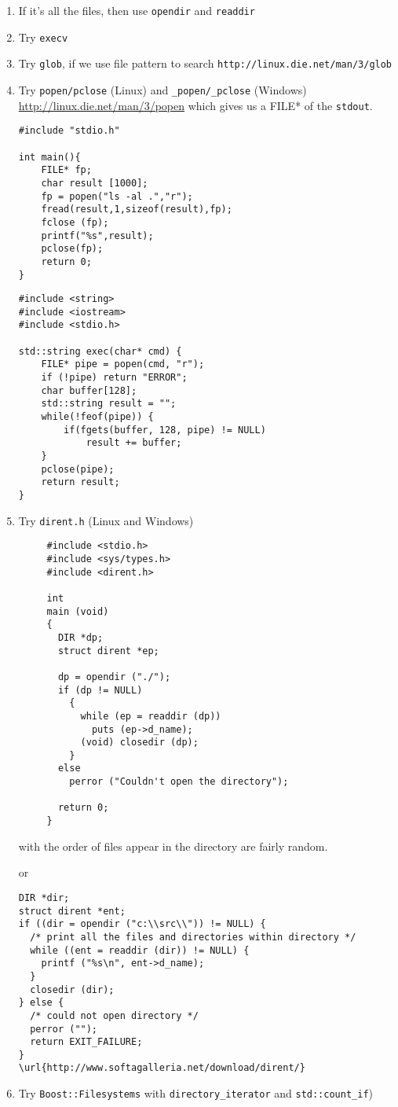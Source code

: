 \begin{enumerate}
  \item If it's all the files, then use \verb!opendir! and \verb!readdir!
  \item Try \verb!execv!
  \item Try \verb!glob!, if we use file pattern to search
  \verb!http://linux.die.net/man/3/glob!
  \item Try \verb!popen/pclose! (Linux) and
  \verb!_popen/_pclose! (Windows) \url{http://linux.die.net/man/3/popen} which
  gives us a FILE* of the \verb!stdout!. 
  \begin{verbatim}
#include "stdio.h"

int main(){
    FILE* fp;
    char result [1000];
    fp = popen("ls -al .","r");
    fread(result,1,sizeof(result),fp);
    fclose (fp);
    printf("%s",result);
    pclose(fp);
    return 0;
}    
  \end{verbatim}
  
  \begin{verbatim}
#include <string>
#include <iostream>
#include <stdio.h>

std::string exec(char* cmd) {
    FILE* pipe = popen(cmd, "r");
    if (!pipe) return "ERROR";
    char buffer[128];
    std::string result = "";
    while(!feof(pipe)) {
    	if(fgets(buffer, 128, pipe) != NULL)
    		result += buffer;
    }
    pclose(pipe);
    return result;
}
  \end{verbatim}
  
  \item Try \verb!dirent.h! (Linux and Windows)
\begin{verbatim}
     #include <stdio.h>
     #include <sys/types.h>
     #include <dirent.h>
     
     int
     main (void)
     {
       DIR *dp;
       struct dirent *ep;
     
       dp = opendir ("./");
       if (dp != NULL)
         {
           while (ep = readdir (dp))
             puts (ep->d_name);
           (void) closedir (dp);
         }
       else
         perror ("Couldn't open the directory");
     
       return 0;
     }
\end{verbatim}
with the order of files appear in the directory are fairly random.

or
  \begin{verbatim}
DIR *dir;
struct dirent *ent;
if ((dir = opendir ("c:\\src\\")) != NULL) {
  /* print all the files and directories within directory */
  while ((ent = readdir (dir)) != NULL) {
    printf ("%s\n", ent->d_name);
  }
  closedir (dir);
} else {
  /* could not open directory */
  perror ("");
  return EXIT_FAILURE;
}
\url{http://www.softagalleria.net/download/dirent/}  
  \end{verbatim}
  
  \item Try \verb!Boost::Filesystems! with \verb!directory_iterator! and
  \verb!std::count_if!)
\end{enumerate}

